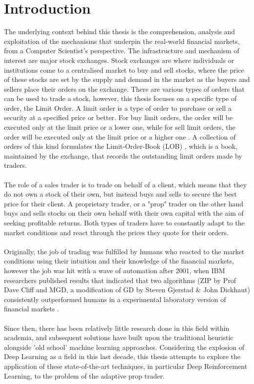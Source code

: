 \documentclass[ %
                    author={Ashwinder Khurana},
                supervisor={Prof Dave Cliff},
                    degree={MEng},
                     title={The Deeply Reinforced Trader},
                  subtitle={},
                      type={enterprise},
                      year={2020} ]{dissertation}
\begin{document}
\section{Introduction}

The underlying context behind this thesis is the comprehension, analysis and exploitation of the mechanisms that underpin the real-world financial markets, from a Computer Scientist's perspective. The infrastructure and mechanism of interest are major stock exchanges. Stock exchanges are where individuals or institutions come to a centralised market to buy and sell stocks, where the price of these stocks are set by the supply and demand in the market as the buyers and sellers place their orders on the exchange. There are various types of orders that can be used to trade a stock, however, this thesis focuses on a specific type of order, the Limit Order. A limit order is a type of order to purchase or sell a security at a specified price or better. For buy limit orders, the order will be executed only at the limit price or a lower one, while for sell limit orders, the order will be executed only at the limit price or a higher one \cite{limit-order}. 
A collection of orders of this kind formulates the Limit-Order-Book (LOB) , which is a book, maintained by the exchange, that records the outstanding limit orders made by traders.  
\\
\\
The role of a sales trader is to trade on behalf of a client, which means that they do not own a stock of their own, but instead buys and sells to secure the best price for their client. A proprietary trader, or a "prop" trader on the other hand buys and sells stocks on their own behalf with their own capital with the aim of seeking profitable returns. Both types of traders have to constantly adapt to the market conditions and react through the prices they quote for their orders. 
\\
\\
Originally, the job of trading was fulfilled by humans who reacted to the market conditions using their intuition and their knowledge of the financial markets, however the job was hit with a wave of automation after 2001, when IBM researchers published results that indicated that two algorithms (ZIP by Prof Dave Cliff and MGD, a modification of GD by Steven Gjerstad \& John Dickhaut) consistently outperformed humans in a experimental laboratory version of financial markets \cite{algorithmic-trading-wiki}. 
\\
\\
Since then, there has been relatively little research done in this field within academia, and subsequent solutions have built upon the traditional heuristic alongside 'old school' machine learning approaches. Considering the explosion of Deep Learning as a field in this last decade, this thesis attempts to explore the application of these state-of-the-art techniques, in particular Deep Reinforcement Learning, to the problem of the adaptive prop trader.
\end{document}
